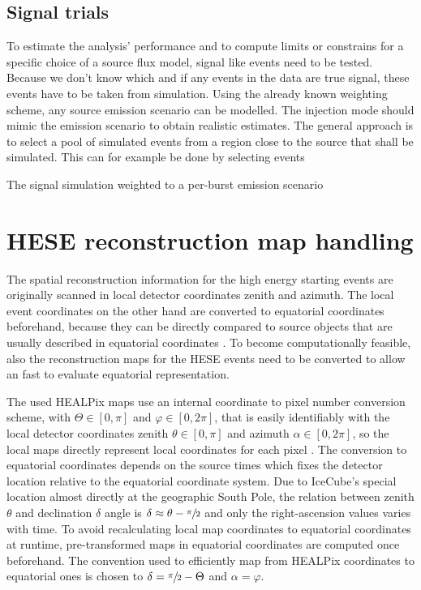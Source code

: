 \subsection*{Signal trials}
To estimate the analysis' performance and to compute limits or constrains for a specific choice of a source flux model, signal like events need to be tested.
Because we don't know which and if any events in the data are true signal, these events have to be taken from simulation.
Using the already known weighting scheme, any source emission scenario can be modelled.
The injection mode should mimic the emission scenario to obtain realistic estimates.
The general approach is to select a pool of simulated events from a region close to the source that shall be simulated.
This can for example be done by selecting events
\HIERWEITER\HIERWEITER\HIERWEITER\HIERWEITER\HIERWEITER\HIERWEITER
\HIERWEITER\HIERWEITER\HIERWEITER\HIERWEITER\HIERWEITER\HIERWEITER
\HIERWEITER\HIERWEITER\HIERWEITER\HIERWEITER\HIERWEITER\HIERWEITER
\HIERWEITER\HIERWEITER\HIERWEITER\HIERWEITER\HIERWEITER\HIERWEITER
\HIERWEITER\HIERWEITER\HIERWEITER\HIERWEITER\HIERWEITER\HIERWEITER
\HIERWEITER\HIERWEITER\HIERWEITER\HIERWEITER\HIERWEITER\HIERWEITER
\HIERWEITER\HIERWEITER\HIERWEITER\HIERWEITER\HIERWEITER\HIERWEITER

The signal simulation weighted to a per-burst emission scenario


\section{HESE reconstruction map handling}
The spatial reconstruction information for the high energy starting events are originally scanned in local detector coordinates zenith and azimuth.
The local event coordinates on the other hand are converted to equatorial coordinates beforehand, because they can be directly compared to source objects that are  usually described in equatorial coordinates .
To become computationally feasible, also the reconstruction maps for the HESE events need to be converted to allow an fast to evaluate equatorial representation.

The used HEALPix maps use an internal coordinate to pixel number conversion scheme, with $\Theta\in[0, \pi]$ and $\varphi\in[0, 2\pi]$, that is easily identifiably with the local detector coordinates zenith $\theta\in[0, \pi]$ and azimuth $\alpha\in[0, 2\pi]$, so the local maps directly represent local coordinates for each pixel .
The conversion to equatorial coordinates depends on the source times which fixes the detector location relative to the equatorial coordinate system.
Due to IceCube's special location almost directly at the geographic South Pole, the relation between zenith $\theta$ and declination $\delta$ angle is $\delta \approx \theta - \sfrac{\pi}{2}$ and only the right-ascension values varies with time.
To avoid recalculating local map coordinates to equatorial coordinates at runtime, pre-transformed maps in equatorial coordinates are computed once beforehand.
The convention used to efficiently map from HEALPix coordinates to equatorial ones is chosen to $\delta = \sfrac{\pi}{2} - \Theta$ and $\alpha = \varphi$.

